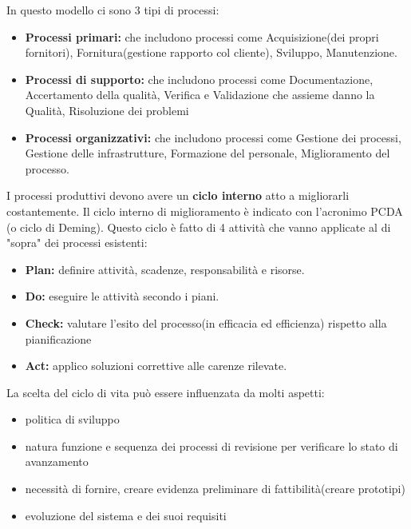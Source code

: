 In questo modello ci sono 3 tipi di processi:
\begin{itemize}
	\item \textbf{Processi primari:} che includono processi come Acquisizione(dei propri fornitori), Fornitura(gestione rapporto col cliente), Sviluppo, Manutenzione.
	\item\textbf{Processi di supporto:} che includono processi come Documentazione, Accertamento della qualità, Verifica e Validazione che assieme danno la Qualità, Risoluzione dei problemi
	\item \textbf{Processi organizzativi:} che includono processi come Gestione dei processi, Gestione delle infrastrutture, Formazione del personale, Miglioramento del processo.
\end{itemize}

I processi produttivi devono avere un \textbf{ciclo interno} atto a migliorarli costantemente. Il ciclo interno di miglioramento è indicato con l'acronimo PCDA (o ciclo di Deming). Questo ciclo è fatto di 4 attività che vanno applicate al di "sopra" dei processi esistenti:

\begin{itemize}

	\item \textbf{Plan:} definire attività, scadenze, responsabilità e risorse.
	\item \textbf{Do:} eseguire le attività secondo i piani.
	\item \textbf{Check:} valutare l'esito del processo(in efficacia ed efficienza) rispetto alla pianificazione
	\item \textbf{Act:} applico soluzioni correttive alle carenze rilevate.

\end{itemize}
La scelta del ciclo di vita può essere influenzata da molti aspetti:
\begin{itemize}
	\item politica di sviluppo
	\item natura funzione e sequenza dei processi di revisione per verificare lo stato di avanzamento
	\item necessità di fornire, creare evidenza preliminare di fattibilità(creare prototipi)
	\item evoluzione del sistema e dei suoi requisiti
\end{itemize}


